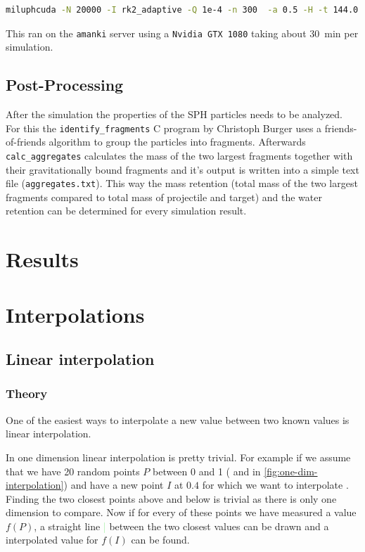 
\begin{lstlisting}[language=bash,flexiblecolumns=false]
miluphcuda -N 20000 -I rk2_adaptive -Q 1e-4 -n 300  -a 0.5 -H -t 144.0 -f impact.0000 -m material.cfg -s -g
\end{lstlisting}

This ran on the \texttt{amanki} server using a \texttt{Nvidia GTX 1080} taking about \SI{30}{\minute} per simulation. 


\section{Post-Processing}

After the simulation the properties of the SPH particles needs to be analyzed. For this the \texttt{identify\_fragments} C program by Christoph Burger uses a friends-of-friends algorithm to group the particles into fragments. Afterwards \texttt{calc\_aggregates} calculates the mass of the two largest fragments together with their gravitationally bound fragments and it's output is written into a simple text file (\texttt{aggregates.txt}). This way the mass retention (total mass of the two largest fragments compared to total mass of projectile and target) and the water retention can be determined for every simulation result.


\chapter{Results}

\chapter{Interpolations}

\section{Linear interpolation}

\subsection{Theory}

One of the easiest ways to interpolate a new value between two known values is linear interpolation. 

In one dimension linear interpolation is pretty trivial. For example if we assume that we have 20 random points $P$ between 0 and 1 (\textcolor{Red}{\textbullet} and  \textcolor{Blue}{\textbullet} in \ref{fig:one-dim-interpolation}) and have a new point $I$ \textcolor{Green}{\textbullet} at $0.4$ for which we want to interpolate . Finding the two closest points \textcolor{Red}{\textbullet} above and below is trivial as there is only one dimension to compare. Now if for every of these points we have measured a value $f(P)$, a straight line  \textcolor{LightGreen}{|} between the two closest values can be drawn and a interpolated value for $f(I)$ can be found.

